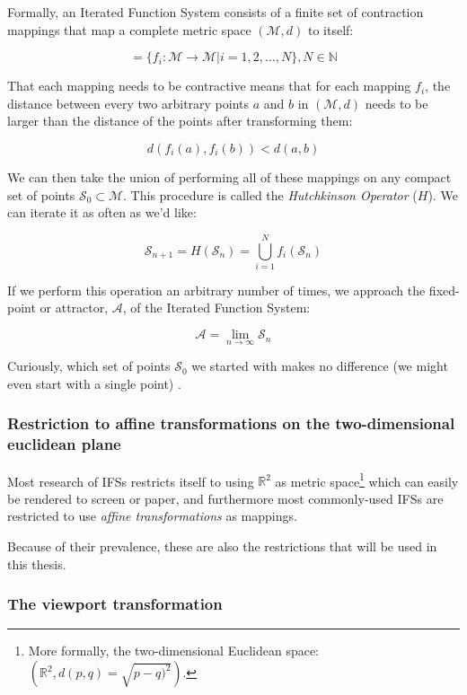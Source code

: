 \documentclass[11pt]{article}
\begin{document}
Formally, an Iterated Function System consists of a finite set of contraction mappings that map a complete metric space \((\mathcal{M}, d)\) to itself:

$$ = \{ f_i : \mathcal{M} \rightarrow \mathcal{M} | i = 1, 2, \ldots, N \}, N \in \mathbb{N}$$

That each mapping needs to be contractive means that for each mapping \(f_i\), the distance between every two arbitrary points \(a\) and \(b\) in \((\mathcal{M}, d)\) needs to be larger than the distance of the points after transforming them:

$$d(f_i(a), f_i(b)) < d(a, b)$$

We can then take the union of performing all of these mappings on any compact set of points \(\mathcal{S}_0 \subset \mathcal{M}\). This procedure is called the \emph{Hutchkinson Operator} (\(H\)). 
We can iterate it as often as we'd like:

$$ \mathcal{S}_{n + 1} = H(\mathcal{S}_n) = \bigcup_{i=1}^{N} f_i(\mathcal{S}_n) $$

If we perform this operation an arbitrary number of times, we approach the fixed-point or attractor, \(\mathcal{A}\), of the Iterated Function System:

$$\mathcal{A} = \lim_{n \rightarrow \infty} \mathcal{S}_n$$

Curiously, which set of points \(\mathcal{S}_0\) we started with makes no difference (we might even start with a single point) \cite{mendivil2003fractals}.

\subsubsection{Restriction to affine transformations on the two-dimensional euclidean plane}
\label{sec:org49102d5}

Most research of IFSs restricts itself to using \(\mathbb{R}^2\) as metric space\footnote{More formally, the two-dimensional Euclidean space: \(\left(\mathbb{R}^2, d(p, q) = \sqrt{p - q)^2}\right)\).} which can easily be rendered to screen or paper,
and furthermore most commonly-used IFSs are restricted to use \emph{affine transformations} as mappings.

Because of their prevalence, these are also the restrictions that will be used in this thesis.

\subsubsection{The viewport transformation}
\label{sec:orgc1a2b21}
\label{subsection:viewport_transformation}
\end{document}
